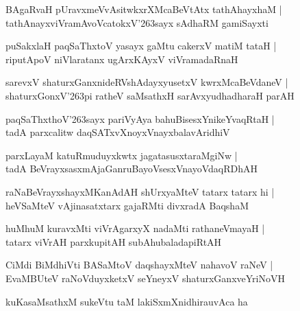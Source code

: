\documentclass[twoside,12pt,openright]{book}
\def\S{\char'263}
\newcounter{shloka}[chapter]
\begin{document}
\begin{shloka}%
BAgaRvaH pUravxmeVvAsitwkxrXMcaBeVtAtx tathAhayxhaM |\\
tathAnayxviVramAvoVcatokxV\S sayx sAdhaRM gamiSayxti
\end{shloka}

\begin{shloka}%
puSakxlaH paqSaThxtoV yasayx gaMtu cakerxV matiM tataH |\\
riputApoV niVlaratanx ugArxKAyxV viVramadaRnaH 
\end{shloka}

\begin{shloka}%
sarevxV shaturxGanxnideRVshAdayxyusetxV kwrxMcaBeVdaneV |\\
shaturxGonxV\S pi ratheV saMsathxH sarAvxyudhadharaH parAH 
\end{shloka}

\begin{shloka}%
paqSaThxthoV\S sayx pariVyAya bahuBisesxYnikeYvaqRtaH |\\
tadA parxcalitw daqSATxvXnoyxVnayxbalavAridhiV 
\end{shloka}

\begin{shloka}%
parxLayaM katuRmuduyxkwtx jagatasusxtaraMgiNw |\\
tadA BeVrayxsasxmAjaGanruBayoVsesxVnayoVdaqRDhAH
\end{shloka}

\begin{shloka}%
raNaBeVrayxshayxMKanAdAH shUrxyaMteV tatarx tatarx hi |\\
heVSaMteV vAjinasatxtarx gajaRMti divxradA BaqshaM 
\end{shloka}

\begin{shloka}%
huMhuM kuravxMti viVrAgarxyX nadaMti rathaneVmayaH |\\
tatarx viVrAH parxkupitAH subAhubaladapiRtAH 
\end{shloka}

\begin{shloka}%
CiMdi BiMdhiVti BASaMtoV daqshayxMteV nahavoV raNeV |\\
EvaMBUteV raNoVduyxketxV seYneyxV shaturxGanxveYriNoVH 
\end{shloka}

\begin{shloka}%
kuKasaMsathxM sukeVtu taM lakiSxmXnidhirauvAca ha 
\end{shloka}
\end{document}
